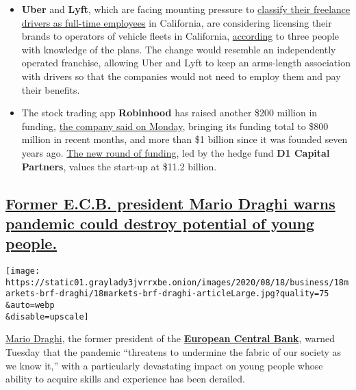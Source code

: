 \begin{itemize}
\item
  \textbf{Uber} and \textbf{Lyft}, which are facing mounting pressure to
  \href{https://www.nytimes3xbfgragh.onion/2019/09/11/technology/california-gig-economy-bill.html}{classify
  their freelance drivers as full-time employees} in California, are
  considering licensing their brands to operators of vehicle fleets in
  California,
  \href{https://www.nytimes3xbfgragh.onion/2020/08/18/technology/uber-lyft-franchise-california.html}{according}
  to three people with knowledge of the plans. The change would resemble
  an independently operated franchise, allowing Uber and Lyft to keep an
  arms-length association with drivers so that the companies would not
  need to employ them and pay their benefits.
\item
  The stock trading app \textbf{Robinhood} has raised another \$200
  million in funding,
  \href{https://blog.robinhood.com/news/2020/8/17/series-g}{the company
  said on Monday}, bringing its funding total to \$800 million in recent
  months, and more than \$1 billion since it was founded seven years
  ago.
  \href{https://www.nytimes3xbfgragh.onion/live/2020/08/17/business/stock-market-today-coronavirus/robinhood-a-stock-trading-app-is-valued-at-11-2-billion-in-its-latest-funding-round}{The
  new round of funding}, led by the hedge fund \textbf{D1 Capital
  Partners}, values the start-up at \$11.2 billion.
\end{itemize}

\hypertarget{former-ecb-president-mario-draghi-warns-pandemic-could-destroy-potential-of-young-people}{%
\subsection{\texorpdfstring{\protect\hyperlink{former-ecb-president-mario-draghi-warns-pandemic-could-destroy-potential-of-young-people}{Former
E.C.B. president Mario Draghi warns pandemic could destroy potential of
young
people.}}{Former E.C.B. president Mario Draghi warns pandemic could destroy potential of young people.}}\label{former-ecb-president-mario-draghi-warns-pandemic-could-destroy-potential-of-young-people}}

\texttt{[image: https://static01.graylady3jvrrxbe.onion/images/2020/08/18/business/18markets-brf-draghi/18markets-brf-draghi-articleLarge.jpg?quality=75\\\&auto=webp\\\&disable=upscale]}

\href{https://www.nytimes3xbfgragh.onion/2019/10/24/business/mario-draghi-ecb.html}{Mario
Draghi}, the former president of the
\textbf{\href{https://www.nytimes3xbfgragh.onion/topic/organization/european-central-bank}{European
Central Bank}}, warned Tuesday that the pandemic ``threatens to
undermine the fabric of our society as we know it,'' with a particularly
devastating impact on young people whose ability to acquire skills and
experience has been derailed.


